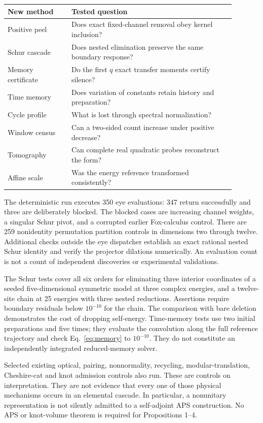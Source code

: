 \documentclass[11pt]{article}
\begin{document}
\begin{center}\small
\begin{tabular}{p{0.25\linewidth}p{0.64\linewidth}}
\toprule
New method & Tested question\\\midrule
Positive peel & Does exact fixed-channel removal obey kernel inclusion?\\
Schur cascade & Does nested elimination preserve the same boundary response?\\
Memory certificate & Do the first $q$ exact transfer moments certify silence?\\
Time memory & Does variation of constants retain history and preparation?\\
Cycle profile & What is lost through spectral normalization?\\
Window census & Can a two-sided count increase under positive decrease?\\
Tomography & Can complete real quadratic probes reconstruct the form?\\
Affine scale & Was the energy reference transformed consistently?\\\bottomrule
\end{tabular}
\end{center}

The deterministic run executes 350 eye evaluations: 347 return successfully and three are deliberately blocked. The blocked cases are increasing channel weights, a singular Schur pivot, and a corrupted earlier Fox-calculus control. There are 259 nonidentity permutation partition controls in dimensions two through twelve. Additional checks outside the eye dispatcher establish an exact rational nested Schur identity and verify the projector dilations numerically. An evaluation count is not a count of independent discoveries or experimental validations.

The Schur tests cover all six orders for eliminating three interior coordinates of a seeded five-dimensional symmetric model at three complex energies, and a twelve-site chain at 25 energies with three nested reductions. Assertions require boundary residuals below $10^{-10}$ for the chain. The comparison with bare deletion demonstrates the cost of dropping self-energy. Time-memory tests use two initial preparations and five times; they evaluate the convolution along the full reference trajectory and check Eq.~\eqref{eq:memory} to $10^{-10}$. They do not constitute an independently integrated reduced-memory solver.

Selected existing optical, pairing, nonnormality, recycling, modular-translation, Cheshire-cat and knot admission controls also run. These are controls on interpretation. They are not evidence that every one of those physical mechanisms occurs in an elemental cascade. In particular, a nonunitary representation is not silently admitted to a self-adjoint APS construction. No APS or knot-volume theorem is required for Propositions 1--4.
\end{document}
